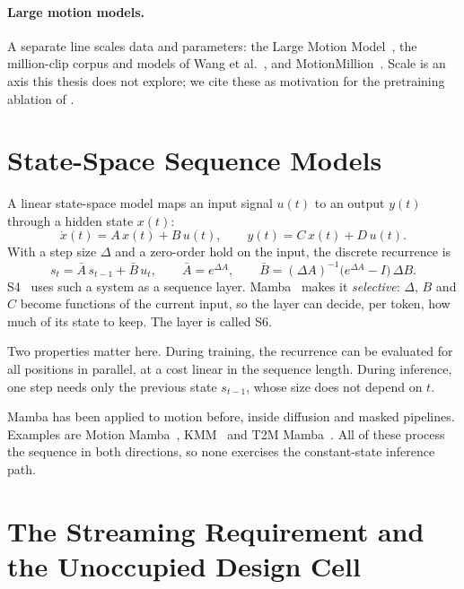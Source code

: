 \paragraph{Large motion models.} A separate line scales data and parameters: the Large Motion Model~\cite{zhang2024lmm}, the million-clip corpus and models of Wang et al.~\cite{wang2024beingm0}, and MotionMillion~\cite{fan2025motionmillion}. Scale is an axis this thesis does not explore; we cite these as motivation for the pretraining ablation of .

\section{State-Space Sequence Models}
\label{sec:bg_ssm}

A linear state-space model maps an input signal $u(t)$ to an output $y(t)$ through a hidden state $x(t)$:
\begin{equation}
\dot{x}(t) = A\,x(t) + B\,u(t), \qquad y(t) = C\,x(t) + D\,u(t).
\label{eq:ssm_continuous}
\end{equation}
With a step size $\Delta$ and a zero-order hold on the input, the discrete recurrence is
\begin{equation}
s_t = \bar{A}\,s_{t-1} + \bar{B}\,u_t, \qquad \bar{A} = e^{\Delta A}, \qquad \bar{B} = (\Delta A)^{-1}\bigl(e^{\Delta A} - I\bigr)\,\Delta B .
\label{eq:ssm_discrete}
\end{equation}
S4~\cite{gu2022s4} uses such a system as a sequence layer. Mamba~\cite{gu2023mamba} makes it \emph{selective}: $\Delta$, $B$ and $C$ become functions of the current input, so the layer can decide, per token, how much of its state to keep. The layer is called S6.

Two properties matter here. During training, the recurrence can be evaluated for all positions in parallel, at a cost linear in the sequence length. During inference, one step needs only the previous state $s_{t-1}$, whose size does not depend on $t$.

Mamba has been applied to motion before, inside diffusion and masked pipelines. Examples are Motion Mamba~\cite{zhang2024motionmamba}, KMM~\cite{zhang2024kmm} and T2M Mamba~\cite{zhan2026t2mmamba}. All of these process the sequence in both directions, so none exercises the constant-state inference path.

\section{The Streaming Requirement and the Unoccupied Design Cell}
\label{sec:bg_streaming}

